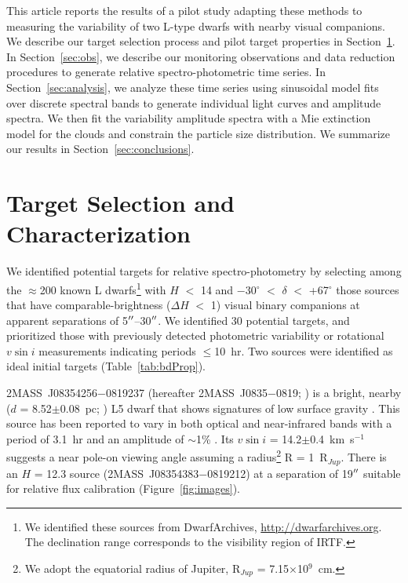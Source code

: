 \documentclass[twocolumn]{aastex6}
\newcommand{\degree}{$^\circ$}
\newcommand{\kms}{km~s$^{-1}$}
\newcommand{\rjup}{R$_{Jup}$}
\newcommand{\sha}{2MASS~J0835$-$0819}
\begin{document}
This article reports the results of a pilot study adapting these methods to measuring the variability of two L-type dwarfs with nearby visual companions. We describe our target selection process and pilot target properties in Section~\ref{sec:targets}.
In Section~\ref{sec:obs}, we describe our monitoring observations and data reduction procedures to generate relative spectro-photometric time series.
In Section~\ref{sec:analysis}, we analyze these time series using sinusoidal model fits over discrete spectral bands to generate individual light curves and amplitude spectra.
We then fit the variability amplitude spectra with a Mie extinction model for the clouds and constrain the particle size distribution.
We summarize our results in Section~\ref{sec:conclusions}.

\section{Target Selection and Characterization}\label{sec:targets}

We identified potential targets for relative spectro-photometry by selecting among the $\approx$200 known L dwarfs\footnote{We identified these sources from DwarfArchives,  \url{http://dwarfarchives.org}. The declination range corresponds to the visibility region of IRTF.} with $H$ $<$ 14 and $-$30{\degree}  $<$ $\delta$ $<$ +67{\degree} those sources that have comparable-brightness ($\Delta{H}$ $<$ 1) visual binary companions at apparent separations of 5$\mbox{$^{\prime\prime}$}$--30$\mbox{$^{\prime\prime}$}$. We identified 30 potential targets, and prioritized those with previously detected photometric variability or rotational $v\sin{i}$ measurements indicating periods $\leq$10~hr.  Two sources were identified as ideal initial targets (Table~\ref{tab:bdProp}).

2MASS~J08354256$-$0819237 (hereafter {\sha}; \citealt{2003AJ....126.2421C}) is a bright, nearby ($d$ = 8.52$\pm$0.08~pc; \citealt{2016AJ....152...24W}) L5 dwarf that shows signatures of low surface gravity \citep{2016ApJ...833...96L}. 
This source has been reported to vary in both optical and near-infrared bands with a period of 3.1~hr and an amplitude of $\sim$1\%  \citep{2004MNRAS.354..378K,2014A&A...566A.111W}.
Its $v\sin{i}$ = 14.2$\pm$0.4~{\kms} \citep{2010ApJ...723..684B} suggests a near pole-on viewing angle assuming a radius\footnote{We adopt the equatorial radius of Jupiter, {\rjup} = 7.15$\times$10$^9$~cm.} R = 1~{\rjup}.
There is an $H$ = 12.3 source (2MASS~J08354383$-$0819212) at a separation of 19$\mbox{$^{\prime\prime}$}$ suitable for relative flux calibration (Figure~\ref{fig:images}). 
\end{document}
